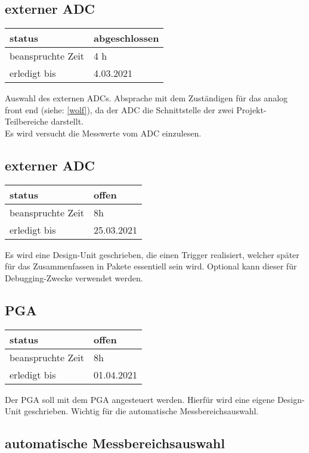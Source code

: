\subsection{externer ADC}

\begin{tabular}[h]{|l|l|} %
	\hline
	status & abgeschlossen\\
	\hline
	beanspruchte Zeit & 4 h\\
	\hline
	erledigt bis & 4.03.2021 \\
	\hline
\end{tabular}
Auswahl des externen ADCs. Absprache mit dem Zuständigen für das analog front end (siehe: \ref{wolf}), da der ADC die Schnittstelle der zwei Projekt-Teilbereiche darstellt.\\Es wird versucht die Messwerte vom ADC einzulesen.

\subsection{externer ADC}

\begin{tabular}[h]{|l|l|} %
	\hline
	status & offen\\
	\hline
	beanspruchte Zeit & 8h \\
	\hline
	erledigt bis & 25.03.2021 \\
	\hline
\end{tabular}
Es wird eine Design-Unit geschrieben, die einen Trigger realisiert, welcher später für das Zusammenfassen in Pakete essentiell sein wird. Optional kann dieser für Debugging-Zwecke verwendet werden.

\subsection{PGA}

\begin{tabular}[h]{|l|l|} %
	\hline
	status & offen\\
	\hline
	beanspruchte Zeit & 8h \\
	\hline
	erledigt bis & 01.04.2021 \\
	\hline
\end{tabular}
Der PGA soll mit dem PGA angesteuert werden. Hierfür wird eine eigene Design-Unit geschrieben. Wichtig für die automatische Messbereichsauswahl.

\subsection{automatische Messbereichsauswahl}


